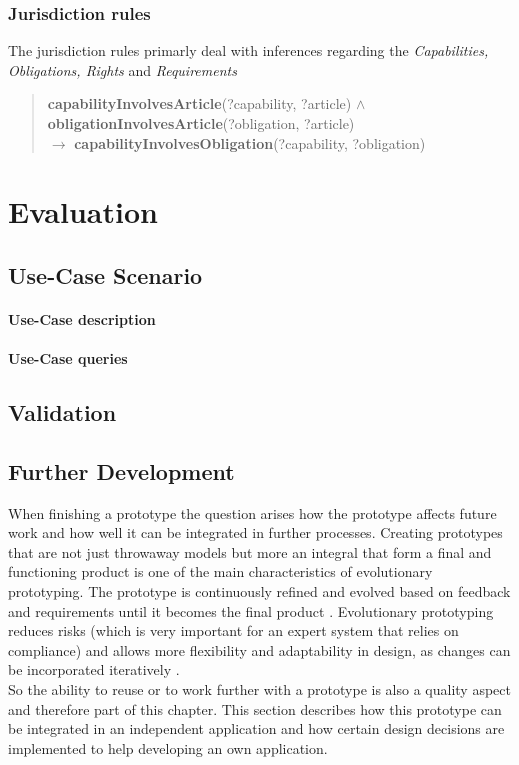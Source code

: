 \documentclass[
  a4paper,  %
  twoside,  %
  bibliography=totoc,
  headsepline,
  cleardoublepage=empty,
  parskip=half,
  draft=false
]{scrbook}
\begin{document}
\subsection{Jurisdiction rules}

The jurisdiction rules primarly deal with inferences regarding the \textit{Capabilities, Obligations, Rights} and \textit{Requirements}

\begin{quote}
\textbf{capabilityInvolvesArticle}(?capability, ?article)  $\land$  
\textbf{obligationInvolvesArticle}(?obligation, ?article) \\ $\rightarrow$ 
\textbf{capabilityInvolvesObligation}(?capability, ?obligation)
\end{quote}


\chapter{Evaluation}
\section{Use-Case Scenario}\label{sec:useCase}
\subsubsection{Use-Case description}
\subsubsection{Use-Case queries}

\section{Validation}

\section{Further Development}\label{sec:furtherDevelopment}
When finishing a prototype the question arises how the prototype affects future work and how well it can be integrated in further processes. Creating prototypes that are not just throwaway models but more an integral that form a final and functioning product is one of the main characteristics of evolutionary prototyping. The prototype is continuously refined and evolved based on feedback and requirements until it becomes the final product \cite{Boehm}. Evolutionary prototyping reduces risks (which is very important for an expert system that relies on compliance) \cite{sommerville2011software} and allows more flexibility and adaptability in design, as changes can be incorporated iteratively \cite{pressman2014software}.  \\  So the ability to reuse or to work further with a prototype is also a quality aspect and therefore part of this chapter. This section describes how this prototype can be integrated in an independent application and how certain design decisions are implemented to help developing an own application. \\
\end{document}
